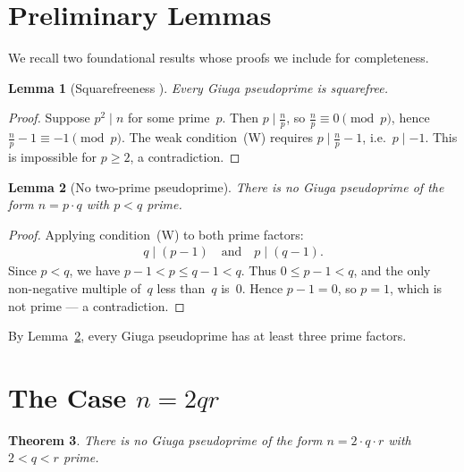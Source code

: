 \documentclass[12pt,a4paper]{amsart}
\newtheorem{theorem}{Theorem}[section]
\newtheorem{lemma}[theorem]{Lemma}
\theoremstyle{definition}
\begin{document}
\section{Preliminary Lemmas}

We recall two foundational results whose proofs we include for completeness.

\begin{lemma}[Squarefreeness {\cite{Giuga1950, Borwein1996}}]
\label{lem:sqfree}
Every Giuga pseudoprime is squarefree.
\end{lemma}

\begin{proof}
Suppose $p^2 \mid n$ for some prime~$p$.  Then $p \mid \tfrac{n}{p}$, so
$\tfrac{n}{p} \equiv 0 \pmod{p}$, hence $\tfrac{n}{p} - 1 \equiv -1 \pmod{p}$.
The weak condition~(W) requires $p \mid \tfrac{n}{p} - 1$, i.e.\ $p \mid {-1}$.
This is impossible for $p \ge 2$, a contradiction.
\end{proof}

\begin{lemma}[No two-prime pseudoprime]
\label{lem:twoprime}
There is no Giuga pseudoprime of the form $n = p \cdot q$ with $p < q$ prime.
\end{lemma}

\begin{proof}
Applying condition~(W) to both prime factors:
\begin{align*}
  q \mid (p - 1) \quad\text{and}\quad p \mid (q - 1).
\end{align*}
Since $p < q$, we have $p - 1 < p \le q - 1 < q$.
Thus $0 \le p - 1 < q$, and the only non-negative multiple of~$q$ less than~$q$
is~$0$.  Hence $p - 1 = 0$, so $p = 1$, which is not prime — a contradiction.
\end{proof}

By Lemma~\ref{lem:twoprime}, every Giuga pseudoprime has at least three prime
factors.

\section{The Case \texorpdfstring{$n = 2qr$}{n = 2qr}}
\label{sec:even}

\begin{theorem}
\label{thm:2qr}
There is no Giuga pseudoprime of the form $n = 2 \cdot q \cdot r$
with $2 < q < r$ prime.
\end{theorem}
\end{document}
